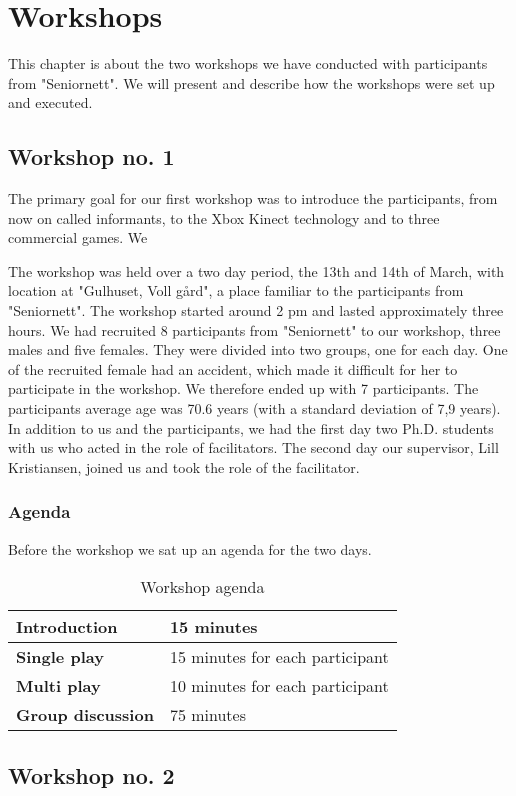 \chapter{Workshops}
This chapter is about the two workshops we have conducted with participants from "Seniornett". We will present and describe how the workshops were set up and executed.
    
\section{Workshop no. 1}
The primary goal for our first workshop was to introduce the participants, from now on called informants, to the Xbox Kinect technology and to three commercial games. We  

The workshop was held over a two day period, the 13th and 14th of March, with location at "Gulhuset, Voll gård", a place familiar to the participants from "Seniornett". The workshop started around 2 pm and lasted approximately three hours. We had recruited 8 participants from "Seniornett" to our workshop, three males and five females. They were divided into two groups, one for each day. One of the recruited female had an accident, which made it difficult for her to participate in the workshop. We therefore ended up with 7 participants. The participants average age was 70.6 years (with a standard deviation of 7,9 years). In addition to us and the participants, we had the first day two Ph.D. students with us who acted in the role of facilitators. The second day our supervisor, Lill Kristiansen, joined us and took the role of the facilitator.   

\subsection{Agenda}
Before the workshop we sat up an agenda for the two days. 

\begin{table}
\centering
    \begin{tabular}{|l|l|}
       \hline
       \textbf{Introduction} & 15 minutes  \\ \hline
       \textbf{Single play} & 15 minutes for each participant \\ \hline
       \textbf{Multi play} & 10 minutes for each participant \\ \hline
	   \textbf{Group discussion} & 75 minutes \\ \hline
    \end{tabular}
    \caption[Workshop Agenda]{Workshop agenda}
    \label{tab:agenda}
\end{table} 

\section{Workshop no. 2}